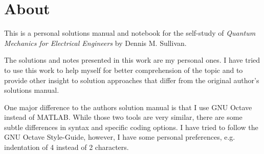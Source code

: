 \chapter*{About}
This is a personal solutions manual and notebook for the self-study of
\emph{Quantum Mechanics for Electrical Engineers} by Dennis M. Sullivan.

The solutions and notes presented in this work are my personal ones. I have
tried to use this work to help myself for better comprehension of the topic
and to provide other insight to solution approaches that differ from the
original author's solutions manual.

One major difference to the authors solution manual is that I use GNU Octave
instead of MATLAB. While those two tools are very similar, there are some
subtle differences in syntax and specific coding options. I have tried to
follow the GNU Octave Style-Guide, however, I have some personal preferences,
e.g. indentation of 4 instead of 2 characters.
